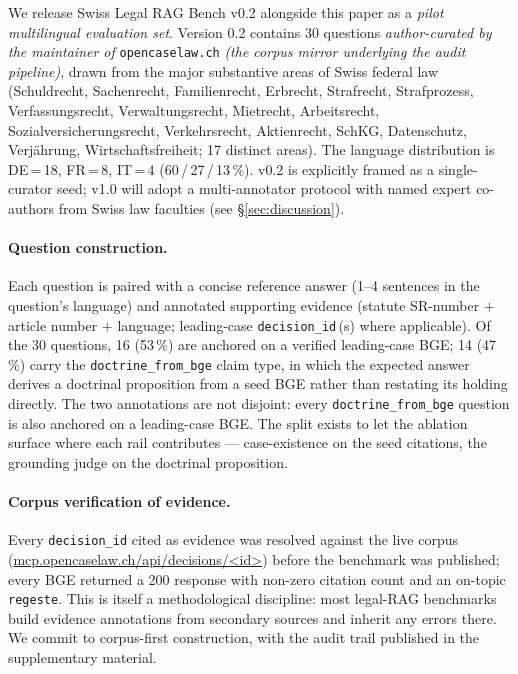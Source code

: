\documentclass[11pt,a4paper]{article}
\begin{document}
We release Swiss Legal RAG Bench v0.2 alongside this
paper as a \emph{pilot multilingual evaluation set}.
Version 0.2 contains 30 questions \emph{author-curated
by the maintainer of} \texttt{opencaselaw.ch}
\emph{(the corpus mirror underlying the audit
pipeline)}, drawn from the major substantive areas of
Swiss federal law
(Schuldrecht, Sachenrecht, Familienrecht, Erbrecht,
Strafrecht, Strafprozess, Verfassungsrecht,
Verwaltungsrecht, Mietrecht, Arbeitsrecht,
Sozialversicherungsrecht, Verkehrsrecht, Aktienrecht,
SchKG, Datenschutz, Verjährung, Wirtschaftsfreiheit;
17 distinct areas).  The language distribution is
DE\,=\,18, FR\,=\,8, IT\,=\,4 (60\,/\,27\,/\,13\,\%).
v0.2 is explicitly framed as a single-curator seed;
v1.0 will adopt a multi-annotator protocol with
named expert co-authors from Swiss law faculties
(see \S\ref{sec:discussion}).

\paragraph{Question construction.}
Each question is paired with a concise reference answer
(1--4 sentences in the question's language) and
annotated supporting evidence (statute SR-number
$+$ article number $+$ language; leading-case
\texttt{decision\_id}\,(s) where applicable).  Of the
30 questions, 16 (53\,\%) are anchored on a verified
leading-case BGE; 14 (47\,\%) carry the
\texttt{doctrine\_from\_bge} claim type, in which the
expected answer derives a doctrinal proposition from
a seed BGE rather than restating its holding directly.
The two annotations are not disjoint: every
\texttt{doctrine\_from\_bge} question is also anchored
on a leading-case BGE.  The split exists to let the
ablation surface where each rail contributes ---
case-existence on the seed citations, the grounding
judge on the doctrinal proposition.

\paragraph{Corpus verification of evidence.}
Every \texttt{decision\_id} cited as evidence was
resolved against the live corpus
(\url{mcp.opencaselaw.ch/api/decisions/<id>})
before the benchmark was published; every BGE
returned a 200 response with non-zero citation count
and an on-topic \texttt{regeste}.  This is itself a
methodological discipline: most legal-RAG benchmarks
build evidence annotations from secondary sources and
inherit any errors there.  We commit to corpus-first
construction, with the audit trail published in
the supplementary material.
\end{document}
